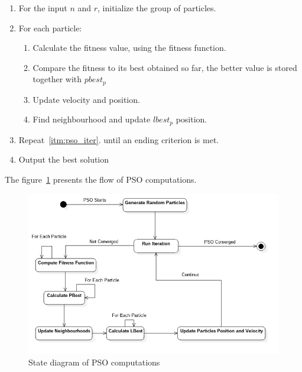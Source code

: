 \documentclass{mini}
\begin{document}
\begin{center}
    
    \begin{enumerate}
        \item For the input $n$ and $r$, initialize the group of particles.
        
        \item For each particle: \label{itm:pso_iter}
        \begin{enumerate}
            \item Calculate the fitness value, using the fitness function.
            \item Compare the fitness to its best obtained so far, the better value is stored together with $pbest_p$	
            
            \item Update velocity and position.	
            
            \item Find neighbourhood and update $lbest_p$ position.
        \end{enumerate}		
        
        
        
        \item Repeat~\ref{itm:pso_iter}. until an ending criterion is met.
        
        \item Output the best solution	
        
    \end{enumerate}
    
\end{center}

The figure~\ref{fig:pso_state} presents the flow of PSO computations.
\begin{figure}
    \includegraphics[width=1.0\textwidth]{../uml/states/pso.jpg}
    \caption{State diagram of PSO computations}
    \label{fig:pso_state}
\end{figure}
\end{document}
